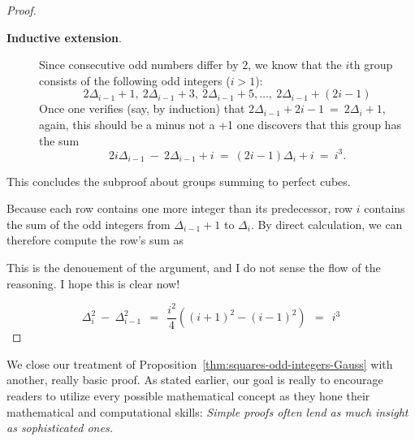 \begin{proof}
\begin{description}
\medskip

\item[{\bf Inductive extension}.]
%
Since consecutive odd numbers differ by $2$, we know that the $i$th
group consists of the following odd integers ($i>1$):
\[
2 \Delta_{i-1} +1, \ 2 \Delta_{i-1}  +3, \ 2 \Delta_{i-1}  +5 ,
\ldots, \
2 \Delta_{i-1} + (2i-1)
\]
Once one verifies (say, by induction) that $2 \Delta_{i-1} +2i-1 \ = \ 2
\Delta_{i} +1$, 
{\Denis again, this should be a minus not a +1}
one discovers that this group has the sum
\[
2i \Delta_{i-1} \ - \ 2 \Delta_{i-1} +i \ = \
(2i -1) \Delta_i + i \ = \ i^3.
\]
\end{description}
This concludes the subproof about groups summing to perfect cubes.

Because each row contains one more integer than its predecessor, row
$i$ contains the sum of the odd integers from $\Delta_{i-1}+1$ to
$\Delta_i$.  By direct calculation, we can therefore compute the row's
sum as

{\Arny This is the denouement of the argument, and I do not sense the flow of the reasoning.}
{\Denis I hope this is clear now!}

\[
\Delta_i^2 \ - \ \Delta_{i-1}^2 
 \ \ =  \ \ \frac{i^2}{4} \left( (i+1)^2 - (i-1)^2 \right)
 \ \ = \ \ i^3
\]
\end{proof}

\bigskip

We close our treatment of
Proposition~\ref{thm:squares-odd-integers-Gauss} with another, really
basic proof.  As stated earlier, our goal is really to encourage
readers to utilize every possible mathematical concept as they hone
their mathematical and computational skills: {\em Simple proofs often
lend as much insight as sophisticated ones.}


%

